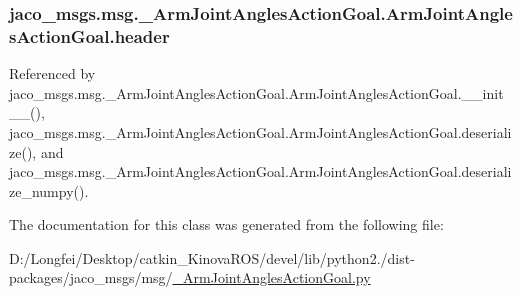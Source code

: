\subsubsection[{\texorpdfstring{header}{header}}]{\setlength{\rightskip}{0pt plus 5cm}jaco\+\_\+msgs.\+msg.\+\_\+\+Arm\+Joint\+Angles\+Action\+Goal.\+Arm\+Joint\+Angles\+Action\+Goal.\+header}\hypertarget{classjaco__msgs_1_1msg_1_1__ArmJointAnglesActionGoal_1_1ArmJointAnglesActionGoal_aaea49c5d26e095d3e05e1164e8b78f88}{}\label{classjaco__msgs_1_1msg_1_1__ArmJointAnglesActionGoal_1_1ArmJointAnglesActionGoal_aaea49c5d26e095d3e05e1164e8b78f88}


Referenced by jaco\+\_\+msgs.\+msg.\+\_\+\+Arm\+Joint\+Angles\+Action\+Goal.\+Arm\+Joint\+Angles\+Action\+Goal.\+\_\+\+\_\+init\+\_\+\+\_\+(), jaco\+\_\+msgs.\+msg.\+\_\+\+Arm\+Joint\+Angles\+Action\+Goal.\+Arm\+Joint\+Angles\+Action\+Goal.\+deserialize(), and jaco\+\_\+msgs.\+msg.\+\_\+\+Arm\+Joint\+Angles\+Action\+Goal.\+Arm\+Joint\+Angles\+Action\+Goal.\+deserialize\+\_\+numpy().



The documentation for this class was generated from the following file\+:\begin{DoxyCompactItemize}
\item 
D\+:/\+Longfei/\+Desktop/catkin\+\_\+\+Kinova\+R\+O\+S/devel/lib/python2./dist-\/packages/jaco\+\_\+msgs/msg/\hyperlink{__ArmJointAnglesActionGoal_8py}{\+\_\+\+Arm\+Joint\+Angles\+Action\+Goal.\+py}\end{DoxyCompactItemize}
